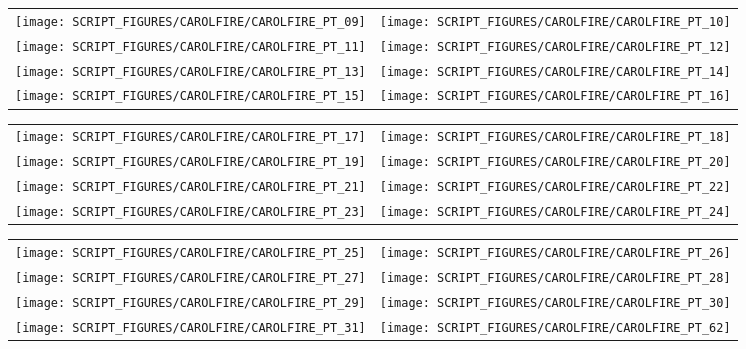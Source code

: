 \begin{figure}[p]
\begin{tabular*}{\textwidth}{l@{\extracolsep{\fill}}r}
\texttt{[image: SCRIPT\_FIGURES/CAROLFIRE/CAROLFIRE\_PT\_09]} &
\texttt{[image: SCRIPT\_FIGURES/CAROLFIRE/CAROLFIRE\_PT\_10]} \\
\texttt{[image: SCRIPT\_FIGURES/CAROLFIRE/CAROLFIRE\_PT\_11]} &
\texttt{[image: SCRIPT\_FIGURES/CAROLFIRE/CAROLFIRE\_PT\_12]} \\
\texttt{[image: SCRIPT\_FIGURES/CAROLFIRE/CAROLFIRE\_PT\_13]} &
\texttt{[image: SCRIPT\_FIGURES/CAROLFIRE/CAROLFIRE\_PT\_14]} \\
\texttt{[image: SCRIPT\_FIGURES/CAROLFIRE/CAROLFIRE\_PT\_15]} &
\texttt{[image: SCRIPT\_FIGURES/CAROLFIRE/CAROLFIRE\_PT\_16]}
\end{tabular*}
\end{figure}

\begin{figure}[p]
\begin{tabular*}{\textwidth}{l@{\extracolsep{\fill}}r}
\texttt{[image: SCRIPT\_FIGURES/CAROLFIRE/CAROLFIRE\_PT\_17]} &
\texttt{[image: SCRIPT\_FIGURES/CAROLFIRE/CAROLFIRE\_PT\_18]} \\
\texttt{[image: SCRIPT\_FIGURES/CAROLFIRE/CAROLFIRE\_PT\_19]} &
\texttt{[image: SCRIPT\_FIGURES/CAROLFIRE/CAROLFIRE\_PT\_20]} \\
\texttt{[image: SCRIPT\_FIGURES/CAROLFIRE/CAROLFIRE\_PT\_21]} &
\texttt{[image: SCRIPT\_FIGURES/CAROLFIRE/CAROLFIRE\_PT\_22]} \\
\texttt{[image: SCRIPT\_FIGURES/CAROLFIRE/CAROLFIRE\_PT\_23]} &
\texttt{[image: SCRIPT\_FIGURES/CAROLFIRE/CAROLFIRE\_PT\_24]}
\end{tabular*}
\end{figure}

\begin{figure}[p]
\begin{tabular*}{\textwidth}{l@{\extracolsep{\fill}}r}
\texttt{[image: SCRIPT\_FIGURES/CAROLFIRE/CAROLFIRE\_PT\_25]} &
\texttt{[image: SCRIPT\_FIGURES/CAROLFIRE/CAROLFIRE\_PT\_26]} \\
\texttt{[image: SCRIPT\_FIGURES/CAROLFIRE/CAROLFIRE\_PT\_27]} &
\texttt{[image: SCRIPT\_FIGURES/CAROLFIRE/CAROLFIRE\_PT\_28]} \\
\texttt{[image: SCRIPT\_FIGURES/CAROLFIRE/CAROLFIRE\_PT\_29]} &
\texttt{[image: SCRIPT\_FIGURES/CAROLFIRE/CAROLFIRE\_PT\_30]} \\
\texttt{[image: SCRIPT\_FIGURES/CAROLFIRE/CAROLFIRE\_PT\_31]} &
\texttt{[image: SCRIPT\_FIGURES/CAROLFIRE/CAROLFIRE\_PT\_62]}
\end{tabular*}
\end{figure}


